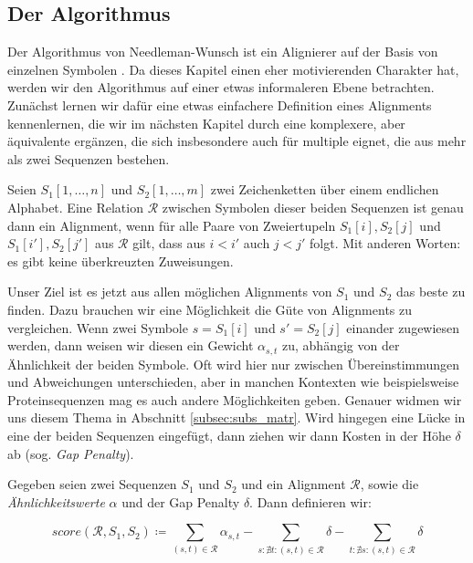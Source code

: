 \subsection{Der Algorithmus}

Der Algorithmus von Needleman-Wunsch ist ein Alignierer auf der Basis von einzelnen Symbolen \cite{nw70}. Da dieses Kapitel einen eher motivierenden Charakter hat, werden wir den Algorithmus auf einer etwas informaleren Ebene betrachten. Zunächst lernen wir dafür eine etwas einfachere Definition eines Alignments kennenlernen, die wir im nächsten Kapitel durch eine komplexere, aber äquivalente ergänzen, die sich insbesondere auch für multiple eignet, die aus mehr als zwei Sequenzen bestehen.

\begin{definition}
	Seien $S_1[1,\dots, n]$ und $S_2[1,\dots,m]$ zwei Zeichenketten über einem endlichen Alphabet. Eine Relation $\mathcal{R}$ zwischen Symbolen dieser beiden Sequenzen ist genau dann ein Alignment, wenn für alle Paare von Zweiertupeln $S_1[i],S_2[j]$ und $S_1[i'],S_2[j']$ aus $\mathcal{R}$ gilt, dass aus $i < i'$ auch $j < j'$ folgt. Mit anderen Worten: es gibt keine überkreuzten Zuweisungen.
\end{definition}

Unser Ziel ist es jetzt aus allen möglichen Alignments von $S_1$ und $S_2$ das beste zu finden. Dazu brauchen wir eine Möglichkeit die Güte von Alignments zu vergleichen. Wenn zwei Symbole $s = S_1[i]$ und $s' = S_2[j]$ einander zugewiesen werden, dann weisen wir diesen ein Gewicht $\alpha_{s,t}$ zu, abhängig von der Ähnlichkeit der beiden Symbole. Oft wird hier nur zwischen Übereinstimmungen und Abweichungen unterschieden, aber in manchen Kontexten wie beispielsweise Proteinsequenzen mag es auch andere Möglichkeiten geben. Genauer widmen wir uns diesem Thema in Abschnitt \ref{subsec:subs_matr}. Wird hingegen eine Lücke in eine der beiden Sequenzen eingefügt, dann ziehen wir dann Kosten in der Höhe $\delta$ ab (sog. \emph{Gap Penalty}).

\begin{definition}
	Gegeben seien zwei Sequenzen $S_1$ und $S_2$ und ein Alignment $\mathcal{R}$, sowie die \emph{Ähnlichkeitswerte} $\alpha$ und  der Gap Penalty $\delta$. Dann definieren wir:
	
	\begin{equation}
		score(\mathcal{R},S_1,S_2) \coloneqq \sum_{(s,t)\in \mathcal{R}}{\alpha_{s,t}} - \sum_{s : \nexists t : (s,t)\in \mathcal{R}}{\delta} - \sum_{t : \nexists s : (s,t)\in \mathcal{R}}{\delta}
	\end{equation}
\end{definition}

